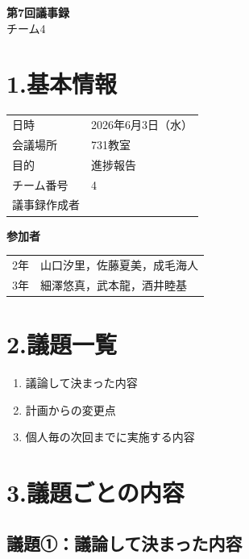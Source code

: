 \documentclass[a4paper,12pt]{ltjsarticle}
\begin{document}
\begin{center}
  {\Large \textbf{第7回議事録}}\\[8pt]
  {\large チーム4}
\end{center}

\vspace{4mm}

\section*{1.基本情報}
\begin{tabular}{ll}
  \toprule
  日時     & 2026年6月3日（水） \\
  会議場所 & 731教室 \\
  目的     & 進捗報告 \\
  チーム番号 & 4 \\
  議事録作成者 &  \\
  \bottomrule
\end{tabular}

\vspace{4mm}
\noindent\textbf{参加者}

\begin{tabular}{ll}
  2年 & 山口汐里，佐藤夏美，成毛海人 \\
  3年 & 細澤悠真，武本龍，酒井睦基 \\
\end{tabular}

\section*{2.議題一覧}
\begin{enumerate}[label=議題\arabic*：]
  \item 議論して決まった内容
  \item 計画からの変更点
  \item 個人毎の次回までに実施する内容
\end{enumerate}

\section*{3.議題ごとの内容}

\subsection*{議題①：議論して決まった内容}
\end{document}
